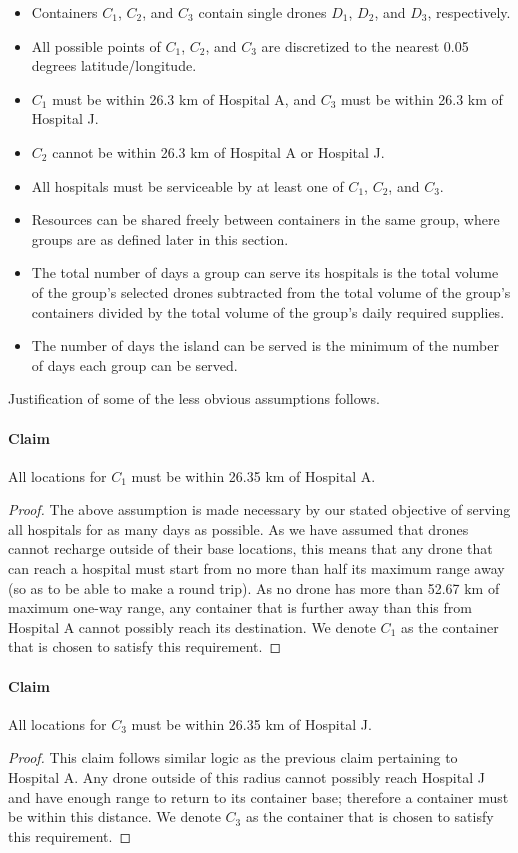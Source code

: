 \begin{itemize}
    \item Containers $C_1$, $C_2$, and $C_3$ contain single drones $D_1$, $D_2$, and $D_3$, respectively.
    \item All possible points of $C_1$, $C_2$, and $C_3$ are discretized to the nearest 0.05 degrees latitude/longitude.
    \item $C_1$ must be within 26.3 km of Hospital A, and $C_3$ must be within 26.3 km of Hospital J.
    \item $C_2$ cannot be within 26.3 km of Hospital A or Hospital J.
    \item All hospitals must be serviceable by at least one of $C_1$, $C_2$, and $C_3$.
    \item Resources can be shared freely between containers in the same group, where groups are as defined later in this section.
    \item The total number of days a group can serve its hospitals is the total volume of the group's selected drones subtracted from the total volume of the group's containers divided by the total volume of the group's daily required supplies.
    \item The number of days the island can be served is the minimum of the number of days each group can be served.
\end{itemize}
Justification of some of the less obvious assumptions follows.

\paragraph{Claim} All locations for $C_1$ must be within 26.35 km of Hospital A.
\begin{proof}
The above assumption is made necessary by our stated objective of serving all hospitals for as many days as possible. As we have assumed that drones cannot recharge outside of their base locations, this means that any drone that can reach a hospital must start from no more than half its maximum range away (so as to be able to make a round trip). As no drone has more than 52.67 km of maximum one-way range, any container that is further away than this from Hospital A cannot possibly reach its destination. We denote $C_1$ as the container that is chosen to satisfy this requirement.  
\end{proof}

\paragraph{Claim} All locations for $C_3$ must be within 26.35 km of Hospital J.
\begin{proof}
This claim follows similar logic as the previous claim pertaining to Hospital A. Any drone outside of this radius cannot possibly reach Hospital J and have enough range to return to its container base; therefore a container must be within this distance. We denote $C_3$ as the container that is chosen to satisfy this requirement.
\end{proof}

